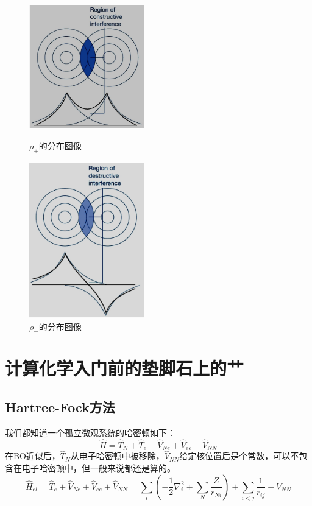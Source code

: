 \begin{figure}[htbp]
    \centering
    \begin{minipage}[t]{0.48\textwidth}
    \centering
    \includegraphics[width=5cm]{fig/lzhx/微信图片_20211102112346.png}
    \caption{$\rho_+$的分布图像}
    \end{minipage}
    \begin{minipage}[t]{0.48\textwidth}
    \centering
    \includegraphics[width=5cm]{fig/lzhx/微信图片_202111021123461.png}
    \caption{$\rho_-$的分布图像}
    \end{minipage}
\end{figure}

\section{计算化学入门前的垫脚石上的艹}
\subsection{Hartree-Fock方法}\label{sec:hf}
我们都知道一个孤立微观系统的哈密顿如下：
\[\hat{H}=\hat{T}_N+\hat{T}_e+\hat{V}_{Ne}+\hat{V}_{ee}+\hat{V}_{NN}\]
在BO近似后，$\hat{T}_N$从电子哈密顿中被移除，$\hat{V}_{NN}$给定核位置后是个常数，可以不包含在电子哈密顿中，但一般来说都还是算的。
\[\hat{H}_{el}=\hat{T}_e+\hat{V}_{Ne}+\hat{V}_{ee}+\hat{V}_{NN}=\sum_i\left(-\frac{1}{2}\nabla^2_i+\sum_N\frac{Z}{r_{Ni}}\right)+\sum_{i<j}\frac{1}{r_{ij}}+V_{NN}\]

